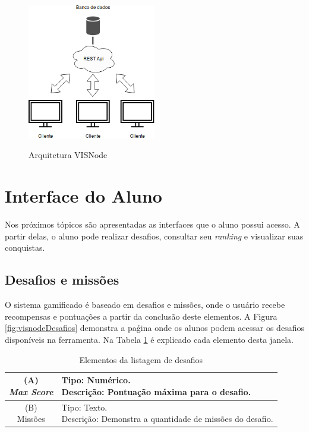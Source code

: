 \documentclass[
	12pt,				%
	oneside,			%
	a4paper,			%
	english,			%
	french,				%
	spanish,			%
	brazil,				%
	]{abntex2}
\begin{document}
\begin{figure}[ht]
\centering
\caption{Arquitetura VISNode}
\includegraphics[width=0.5\textwidth]{imagens/visnode_arquitetura.png}
\sourceAuthor
\label{fig:visnodeArquitetura}
\end{figure}

\section{Interface do Aluno}

Nos próximos tópicos são apresentadas as interfaces que o aluno possui acesso. A partir delas, o aluno pode realizar desafios, consultar seu \textit{ranking} e visualizar suas conquistas.

\subsection{Desafios e missões}

O sistema gamificado é baseado em desafios e missões, onde o usuário recebe recompensas e pontuações a partir da conclusão deste elementos. A Figura \ref{fig:visnodeDesafios} demonstra a paǵina onde os alunos podem acessar os desafios disponíveis na ferramenta. Na Tabela \ref{tab:listagemDesafios} é explicado cada elemento desta janela.

\begin{table}[H]
\centering
\caption{Elementos da listagem de desafios} \label{tab:listagemDesafios}
\renewcommand{\arraystretch}{1.8}
\setlength{\tabcolsep}{10pt}
\begin{tabular}{|c|l|}
  \hline
  \makecell{(A) \\ \textit{Max Score}} 
  &
  \makecell[l]{Tipo: Numérico.\\ Descrição: Pontuação máxima para o desafio.} \\
  \hline
  \makecell{(B) \\ Missões} 
  &
  \makecell[l]{Tipo: Texto.\\ Descrição: Demonstra a quantidade de missões do desafio.} \\
  \hline
\end{tabular}
\centering
\sourceAuthor
\end{table}
\end{document}
